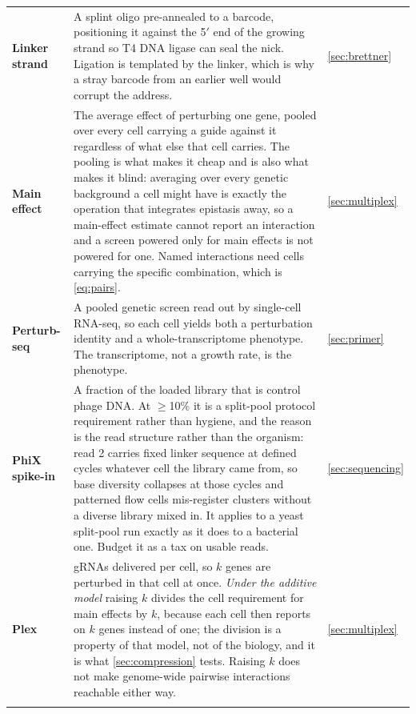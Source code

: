 \begin{longtable}{@{}>{\raggedright\arraybackslash}p{}>{\raggedright\arraybackslash}p{}>{\raggedright\arraybackslash}p{}@{}}
\addlinespace[5pt]
\textbf{Linker strand} & A splint oligo pre-annealed to a barcode, positioning it against the 5$'$ end of the growing strand so T4 DNA ligase can seal the nick. Ligation is templated by the linker, which is why a stray barcode from an earlier well would corrupt the address. & \cref{sec:brettner} \\
\addlinespace[5pt]
\textbf{Main effect} & The average effect of perturbing one gene, pooled over every cell carrying a guide against it regardless of what else that cell carries. The pooling is what makes it cheap and is also what makes it blind: averaging over every genetic background a cell might have is exactly the operation that integrates epistasis away, so a main-effect estimate cannot report an interaction and a screen powered only for main effects is not powered for one. Named interactions need cells carrying the specific combination, which is \cref{eq:pairs}. & \cref{sec:multiplex} \\
\addlinespace[5pt]
\textbf{Perturb-seq} & A pooled genetic screen read out by single-cell RNA-seq, so each cell yields both a perturbation identity and a whole-transcriptome phenotype. The transcriptome, not a growth rate, is the phenotype. & \cref{sec:primer} \\
\addlinespace[5pt]
\textbf{PhiX spike-in} & A fraction of the loaded library that is control phage DNA. At $\ge$10\% it is a split-pool protocol requirement rather than hygiene, and the reason is the read structure rather than the organism: read 2 carries fixed linker sequence at defined cycles whatever cell the library came from, so base diversity collapses at those cycles and patterned flow cells mis-register clusters without a diverse library mixed in. It applies to a yeast split-pool run exactly as it does to a bacterial one. Budget it as a tax on usable reads.~\citep{gaisserHighthroughputSinglecellTranscriptomics2024} & \cref{sec:sequencing} \\
\addlinespace[5pt]
\textbf{Plex}\newline {\color{tcgray}($k$)} & gRNAs delivered per cell, so $k$ genes are perturbed in that cell at once. \emph{Under the additive model} raising $k$ divides the cell requirement for main effects by $k$, because each cell then reports on $k$ genes instead of one; the division is a property of that model, not of the biology, and it is what \cref{sec:compression} tests. Raising $k$ does not make genome-wide pairwise interactions reachable either way. & \cref{sec:multiplex} \\
\addlinespace[5pt]

\end{longtable}
